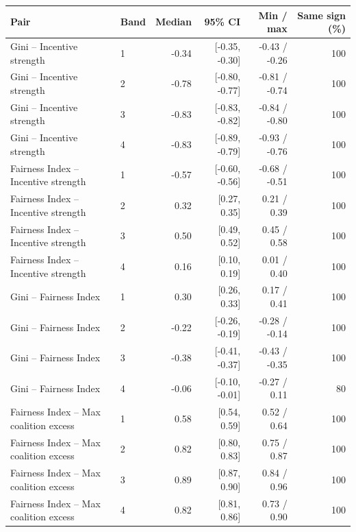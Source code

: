 \begin{tabular}{llrrrr}
\toprule
Pair & Band & Median & 95\% CI & Min / max & Same sign (\%) \\
\midrule
Gini -- Incentive strength & 1 & -0.34 & [-0.35, -0.30] & -0.43 / -0.26 & 100 \\
Gini -- Incentive strength & 2 & -0.78 & [-0.80, -0.77] & -0.81 / -0.74 & 100 \\
Gini -- Incentive strength & 3 & -0.83 & [-0.83, -0.82] & -0.84 / -0.80 & 100 \\
Gini -- Incentive strength & 4 & -0.83 & [-0.89, -0.79] & -0.93 / -0.76 & 100 \\
Fairness Index -- Incentive strength & 1 & -0.57 & [-0.60, -0.56] & -0.68 / -0.51 & 100 \\
Fairness Index -- Incentive strength & 2 & 0.32 & [0.27, 0.35] & 0.21 / 0.39 & 100 \\
Fairness Index -- Incentive strength & 3 & 0.50 & [0.49, 0.52] & 0.45 / 0.58 & 100 \\
Fairness Index -- Incentive strength & 4 & 0.16 & [0.10, 0.19] & 0.01 / 0.40 & 100 \\
Gini -- Fairness Index & 1 & 0.30 & [0.26, 0.33] & 0.17 / 0.41 & 100 \\
Gini -- Fairness Index & 2 & -0.22 & [-0.26, -0.19] & -0.28 / -0.14 & 100 \\
Gini -- Fairness Index & 3 & -0.38 & [-0.41, -0.37] & -0.43 / -0.35 & 100 \\
Gini -- Fairness Index & 4 & -0.06 & [-0.10, -0.01] & -0.27 / 0.11 & 80 \\
Fairness Index -- Max coalition excess & 1 & 0.58 & [0.54, 0.59] & 0.52 / 0.64 & 100 \\
Fairness Index -- Max coalition excess & 2 & 0.82 & [0.80, 0.83] & 0.75 / 0.87 & 100 \\
Fairness Index -- Max coalition excess & 3 & 0.89 & [0.87, 0.90] & 0.84 / 0.96 & 100 \\
Fairness Index -- Max coalition excess & 4 & 0.82 & [0.81, 0.86] & 0.73 / 0.90 & 100 \\
\bottomrule
\end{tabular}

